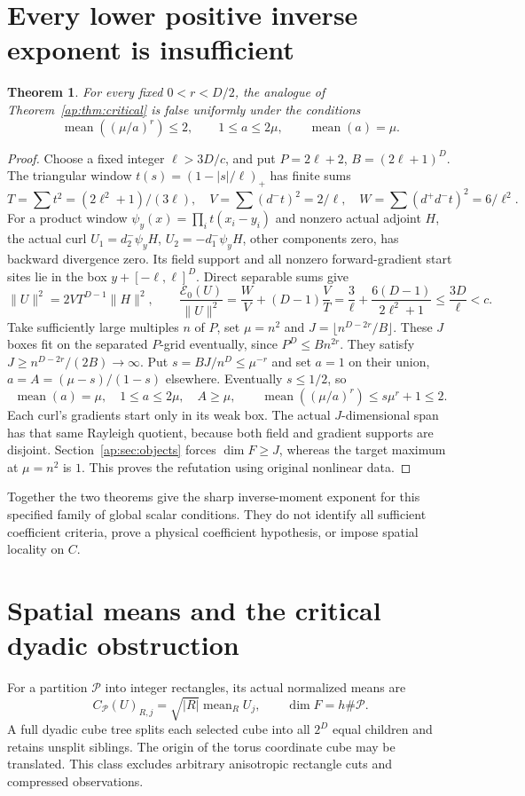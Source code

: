 \documentclass[11pt]{article}
\newtheorem{theorem}{Theorem}[section]
\newcommand{\E}{\mathcal E}
\begin{document}
\section{Every lower positive inverse exponent is insufficient}
\begin{theorem}\label{ap:thm:subcritical}
For every fixed $0<r<D/2$, the analogue of Theorem~\ref{ap:thm:critical}
is false uniformly under the conditions
\[
 \operatorname{mean}((\mu/a)^r)\leq2,\qquad
 1\leq a\leq2\mu,\qquad \operatorname{mean}(a)=\mu.
\]
\end{theorem}
\begin{proof}
Choose a fixed integer $\ell>3D/c$, and put $P=2\ell+2$, $B=(2\ell+1)^D$.
The triangular window $t(s)=(1-|s|/\ell)_+$ has finite sums
\[
 T=\sum t^2=(2\ell^2+1)/(3\ell),\quad
 V=\sum(d^-t)^2=2/\ell,\quad W=\sum(d^+d^-t)^2=6/\ell^2.
\]
For a product window $\psi_y(x)=\prod_it(x_i-y_i)$ and nonzero actual adjoint $H$,
the actual curl $U_1=d^-_2\psi_y H$, $U_2=-d^-_1\psi_y H$, other components zero,
has backward divergence zero. Its field support and all nonzero forward-gradient
start sites lie in the box $y+[-\ell,\ell]^D$. Direct separable sums give
\[
 \|U\|^2=2VT^{D-1}\|H\|^2,\qquad
 \frac{\E_0(U)}{\|U\|^2}=\frac WV+(D-1)\frac VT
 =\frac3\ell+\frac{6(D-1)}{2\ell^2+1}\leq\frac{3D}\ell<c.
\]
Take sufficiently large multiples $n$ of $P$, set $\mu=n^2$ and
$J=\lfloor n^{D-2r}/B\rfloor$. These $J$ boxes fit on the separated $P$-grid
eventually, since $P^D\leq Bn^{2r}$. They satisfy
$J\geq n^{D-2r}/(2B)\to\infty$. Put $s=BJ/n^D\leq \mu^{-r}$ and set $a=1$ on
their union, $a=A=(\mu-s)/(1-s)$ elsewhere. Eventually $s\leq1/2$, so
\[
 \operatorname{mean}(a)=\mu,\quad1\leq a\leq2\mu,\quad A\geq \mu,
 \qquad\operatorname{mean}((\mu/a)^r)\leq s\mu^r+1\leq2.
\]
Each curl's gradients start only in its weak box. The actual $J$-dimensional span
has that same Rayleigh quotient, because both field and gradient supports are
disjoint. Section~\ref{ap:sec:objects} forces $\dim F\geq J$, whereas the target maximum at $\mu=n^2$
is $1$. This proves the refutation using original nonlinear data.
\end{proof}
Together the two theorems give the sharp inverse-moment exponent for this specified
family of global scalar conditions. They do not identify all sufficient coefficient
criteria, prove a physical coefficient hypothesis, or impose spatial locality on $C$.

\section{Spatial means and the critical dyadic obstruction}
For a partition $\mathcal P$ into integer rectangles, its actual normalized means are
\[
 C_{\mathcal P}(U)_{R,j}=\sqrt{|R|}\operatorname{mean}_R U_j,
 \qquad \dim F=h\#\mathcal P.
\]
A full dyadic cube tree splits each selected cube into all $2^D$ equal children and
retains unsplit siblings. The origin of the torus coordinate cube may be translated.
This class excludes arbitrary anisotropic rectangle cuts and compressed observations.
\end{document}
